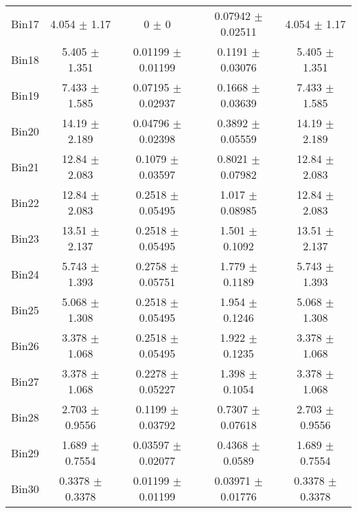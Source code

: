 \begin{tabular}{@{\extracolsep{4pt}}lcccc@{}}
     Bin17 & 4.054 $\pm$ 1.17 & 0 $\pm$ 0 & 0.07942 $\pm$ 0.02511 & 4.054 $\pm$ 1.17 \\ 
     Bin18 & 5.405 $\pm$ 1.351 & 0.01199 $\pm$ 0.01199 & 0.1191 $\pm$ 0.03076 & 5.405 $\pm$ 1.351 \\ 
     Bin19 & 7.433 $\pm$ 1.585 & 0.07195 $\pm$ 0.02937 & 0.1668 $\pm$ 0.03639 & 7.433 $\pm$ 1.585 \\ 
     Bin20 & 14.19 $\pm$ 2.189 & 0.04796 $\pm$ 0.02398 & 0.3892 $\pm$ 0.05559 & 14.19 $\pm$ 2.189 \\ 
     Bin21 & 12.84 $\pm$ 2.083 & 0.1079 $\pm$ 0.03597 & 0.8021 $\pm$ 0.07982 & 12.84 $\pm$ 2.083 \\ 
     Bin22 & 12.84 $\pm$ 2.083 & 0.2518 $\pm$ 0.05495 & 1.017 $\pm$ 0.08985 & 12.84 $\pm$ 2.083 \\ 
     Bin23 & 13.51 $\pm$ 2.137 & 0.2518 $\pm$ 0.05495 & 1.501 $\pm$ 0.1092 & 13.51 $\pm$ 2.137 \\ 
     Bin24 & 5.743 $\pm$ 1.393 & 0.2758 $\pm$ 0.05751 & 1.779 $\pm$ 0.1189 & 5.743 $\pm$ 1.393 \\ 
     Bin25 & 5.068 $\pm$ 1.308 & 0.2518 $\pm$ 0.05495 & 1.954 $\pm$ 0.1246 & 5.068 $\pm$ 1.308 \\ 
     Bin26 & 3.378 $\pm$ 1.068 & 0.2518 $\pm$ 0.05495 & 1.922 $\pm$ 0.1235 & 3.378 $\pm$ 1.068 \\ 
     Bin27 & 3.378 $\pm$ 1.068 & 0.2278 $\pm$ 0.05227 & 1.398 $\pm$ 0.1054 & 3.378 $\pm$ 1.068 \\ 
     Bin28 & 2.703 $\pm$ 0.9556 & 0.1199 $\pm$ 0.03792 & 0.7307 $\pm$ 0.07618 & 2.703 $\pm$ 0.9556 \\ 
     Bin29 & 1.689 $\pm$ 0.7554 & 0.03597 $\pm$ 0.02077 & 0.4368 $\pm$ 0.0589 & 1.689 $\pm$ 0.7554 \\ 
     Bin30 & 0.3378 $\pm$ 0.3378 & 0.01199 $\pm$ 0.01199 & 0.03971 $\pm$ 0.01776 & 0.3378 $\pm$ 0.3378 \\ 
\hline\hline
  \end{tabular}
